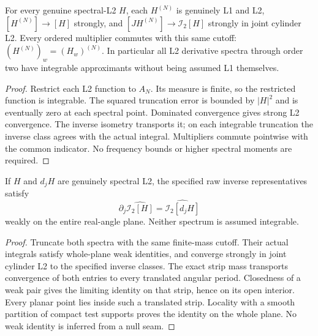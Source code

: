 \begin{lemma}
\label{lem:cylinder-spectral-cutoff}
\leanok
For every genuine spectral-L2 $H$, each $H^{(N)}$ is genuinely L1 and L2,
$[H^{(N)}]\to[H]$ strongly, and
$[JH^{(N)}]\to\mathcal I_2[H]$ strongly in joint cylinder L2.
Every ordered multiplier commutes with this same cutoff:
$(H^{(N)})_w=(H_w)^{(N)}$.
In particular all L2 derivative spectra through order two have integrable
approximants without being assumed L1 themselves.
\end{lemma}

\begin{proof}
\leanok
Restrict each L2 function to $A_N$. Its measure is finite, so the restricted
function is integrable. The squared truncation error is bounded by $|H|^2$
and is eventually zero at each spectral point. Dominated convergence gives
strong L2 convergence.
The inverse isometry transports it; on each integrable truncation the inverse
class agrees with the actual integral. Multipliers commute pointwise with
the common indicator.
No frequency bounds or higher spectral moments are required.
\end{proof}

\begin{lemma}
\label{lem:cylinder-l2-weak-partial}
\leanok
If $H$ and $d_jH$ are genuinely spectral L2, the specified raw inverse
representatives satisfy
\[
 \partial_j\widehat{\mathcal I_2[H]}
   =\widehat{\mathcal I_2[d_jH]}
\]
weakly on the entire real-angle plane.
Neither spectrum is assumed integrable.
\end{lemma}

\begin{proof}
\leanok
Truncate both spectra with the same finite-mass cutoff.
Their actual integrals satisfy whole-plane weak identities, and converge
strongly in joint cylinder L2 to the specified inverse classes.
The exact strip mass transports convergence of both entries to every
translated angular period. Closedness of a weak pair gives the limiting
identity on that strip, hence on its open interior.
Every planar point lies inside such a translated strip.
Locality with a smooth partition of compact test supports proves the identity
on the whole plane. No weak identity is inferred from a null seam.
\end{proof}

